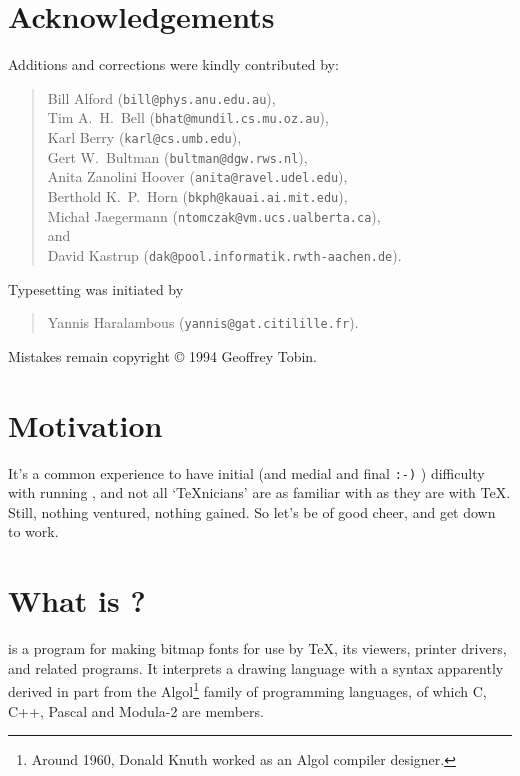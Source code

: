 \section*{Acknowledgements}%

Additions and corrections were kindly contributed by:
\begin{quote}
Bill {\sc Alford} ({\tt bill@phys.anu.edu.au}),\\
Tim A.~H.~{\sc Bell} ({\tt bhat@mundil.cs.mu.oz.au}),\\
Karl {\sc Berry} ({\tt karl@cs.umb.edu}),\\
Gert W.~{\sc Bultman} ({\tt bultman@dgw.rws.nl}),\\
Anita {\sc Zanolini Hoover} ({\tt anita@ravel.udel.edu}),\\
Berthold K.~P.~{\sc Horn} ({\tt bkph@kauai.ai.mit.edu}),\\
Micha{\l} {\sc Jaegermann} ({\tt ntomczak@vm.ucs.ualberta.ca}),\\
\hspace*{4em}and\\
David {\sc Kastrup} ({\tt dak@pool.informatik.rwth-aachen.de}).
\end{quote}

Typesetting was initiated by
\begin{quote}
Yannis {\sc Haralambous} ({\tt yannis@gat.citilille.fr}).
\end{quote}

Mistakes remain copyright \copyright{} 1994 Geoffrey {\sc Tobin}.


\section*{Motivation}%

It's a common experience to have initial (and medial and final
{\tt :-)} ) difficulty with running \MF{}, and not all `\TeX{}nicians'
are as familiar with \MF{} as they are with \TeX{}.  Still, nothing
ventured, nothing gained.  So let's be of good cheer, and get down to
work.


\section{What is \MF{}?}

\MF{} is a program for making bitmap fonts for use by \TeX{},
its viewers, printer drivers, and related programs.
It interprets a drawing language
with a syntax apparently derived in part from the Algol\footnote
{Around 1960, Donald {\sc Knuth} worked as an Algol compiler
designer.}
family of programming languages, of which C, C++, Pascal and Modula-2
are members.

